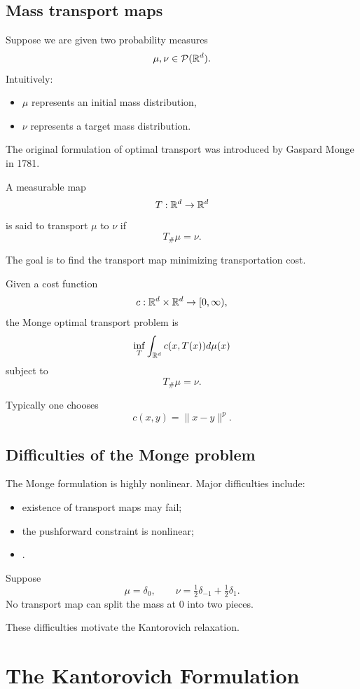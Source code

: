 \subsection{Mass transport maps}
Suppose we are given two probability measures
\[
\mu,\nu \in \mathcal{P}(\mathbb{R}^d).
\]
Intuitively:
\begin{itemize}
    \item $\mu$ represents an initial mass distribution,
    \item $\nu$ represents a target mass distribution.
\end{itemize}
The original formulation of optimal transport was introduced by Gaspard Monge in 1781.
\begin{definition}
A measurable map
\[
T : \mathbb{R}^d \to \mathbb{R}^d
\]
is said to transport $\mu$ to $\nu$ if
\[
T_{\#}\mu = \nu.
\]
\end{definition}
The goal is to find the transport map minimizing transportation cost.
\begin{definition}
Given a cost function
\[
c : \mathbb{R}^d \times \mathbb{R}^d \to [0,\infty),
\]
the Monge optimal transport problem is
\[
\inf_T
\int_{\mathbb{R}^d}
 c(x,T(x))d\mu(x)
\]
subject to
\[
T_{\#}\mu=\nu.
\]
\end{definition}
Typically one chooses
\[
c(x,y)=\|x-y\|^p.
\]
\subsection{Difficulties of the Monge problem}
The Monge formulation is highly nonlinear.
Major difficulties include:
\begin{itemize}
    \item existence of transport maps may fail;
    \item the pushforward constraint is nonlinear;
    \item {}.
\end{itemize}
\begin{example}
Suppose
\[
\mu = \delta_0,
\qquad
\nu = \tfrac12\delta_{-1}+\tfrac12\delta_1.
\]
No transport map can split the mass at $0$ into two pieces.
\end{example}
These difficulties motivate the Kantorovich relaxation.
\section{The Kantorovich Formulation}
